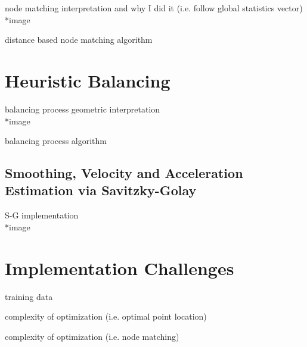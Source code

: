 node matching interpretation and why I did it (i.e. follow global statistics vector)\\
*image

distance based node matching algorithm

\section{Heuristic Balancing} \label{sec:impl-heuristic}

balancing process geometric interpretation\\
*image

balancing process algorithm

\subsection{Smoothing, Velocity and Acceleration Estimation via Savitzky-Golay} \label{subsec:impl-heuristic-vel}

S-G implementation\\
*image

\section{Implementation Challenges} \label{sec:impl-implChallenges}

training data

complexity of optimization (i.e. optimal point location)

complexity of optimization (i.e. node matching)